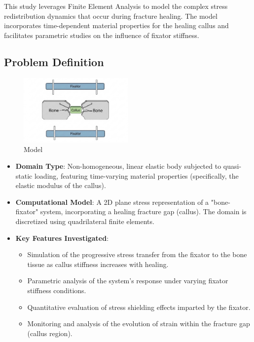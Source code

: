 \documentclass{article}
\begin{document}
This study leverages Finite Element Analysis to model the complex stress redistribution dynamics that occur during fracture healing. The model incorporates time-dependent material properties for the healing callus and facilitates parametric studies on the influence of fixator stiffness.

\subsection{Problem Definition}

\begin{figure}[htbp]
  \centering
  \includegraphics[width=0.5\textwidth]{model_simulation.jpg}
  \caption{Model}
  \label{fig:model}
\end{figure}

\begin{itemize}
  \item \textbf{Domain Type}: Non-homogeneous, linear elastic body subjected to quasi-static loading, featuring time-varying material properties (specifically, the elastic modulus of the callus).
  \item \textbf{Computational Model}: A 2D plane stress representation of a "bone-fixator" system, incorporating a healing fracture gap (callus). The domain is discretized using quadrilateral finite elements.
  \item \textbf{Key Features Investigated}:
        \begin{itemize}
          \item Simulation of the progressive stress transfer from the fixator to the bone tissue as callus stiffness increases with healing.
          \item Parametric analysis of the system's response under varying fixator stiffness conditions.
          \item Quantitative evaluation of stress shielding effects imparted by the fixator.
          \item Monitoring and analysis of the evolution of strain within the fracture gap (callus region).
        \end{itemize}
\end{itemize}
\end{document}
